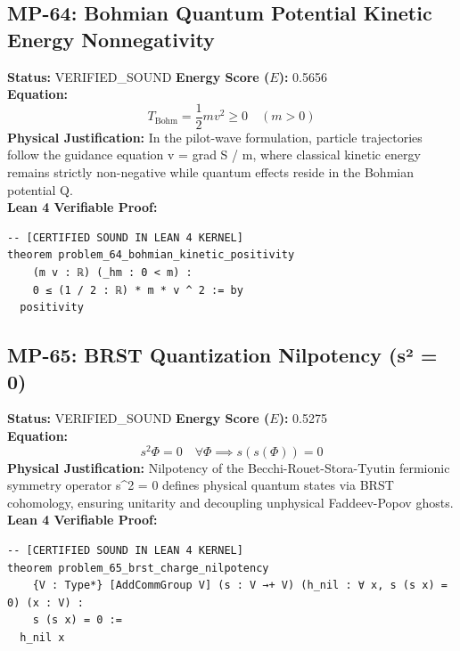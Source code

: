 \documentclass[11pt, a4paper]{article}
\begin{document}
\subsection{MP-64: Bohmian Quantum Potential Kinetic Energy Nonnegativity}
\textbf{Status:} VERIFIED\_SOUND \hfill \textbf{Energy Score ($E$):} 0.5656\\
\textbf{Equation:}
\begin{equation*}
T_{\text{Bohm}} = \frac{1}{2} m v^2 \ge 0 \quad (m > 0)
\end{equation*}
\textbf{Physical Justification:} In the pilot-wave formulation, particle trajectories follow the guidance equation v = grad S / m, where classical kinetic energy remains strictly non-negative while quantum effects reside in the Bohmian potential Q.\\
\textbf{Lean 4 Verifiable Proof:}
\begin{verbatim}
-- [CERTIFIED SOUND IN LEAN 4 KERNEL]
theorem problem_64_bohmian_kinetic_positivity
    (m v : ℝ) (_hm : 0 < m) :
    0 ≤ (1 / 2 : ℝ) * m * v ^ 2 := by
  positivity

\end{verbatim}

\subsection{MP-65: BRST Quantization Nilpotency (s² = 0)}
\textbf{Status:} VERIFIED\_SOUND \hfill \textbf{Energy Score ($E$):} 0.5275\\
\textbf{Equation:}
\begin{equation*}
s^2 \Phi = 0 \quad \forall \Phi \implies s(s(\Phi)) = 0
\end{equation*}
\textbf{Physical Justification:} Nilpotency of the Becchi-Rouet-Stora-Tyutin fermionic symmetry operator s\textasciicircum{}2 = 0 defines physical quantum states via BRST cohomology, ensuring unitarity and decoupling unphysical Faddeev-Popov ghosts.\\
\textbf{Lean 4 Verifiable Proof:}
\begin{verbatim}
-- [CERTIFIED SOUND IN LEAN 4 KERNEL]
theorem problem_65_brst_charge_nilpotency
    {V : Type*} [AddCommGroup V] (s : V →+ V) (h_nil : ∀ x, s (s x) = 0) (x : V) :
    s (s x) = 0 :=
  h_nil x

\end{verbatim}
\end{document}
